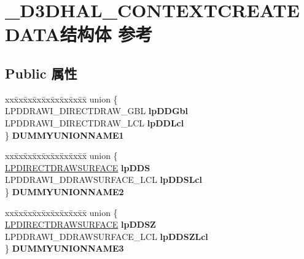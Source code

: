 \hypertarget{struct___d3_d_h_a_l___c_o_n_t_e_x_t_c_r_e_a_t_e_d_a_t_a}{}\section{\+\_\+\+D3\+D\+H\+A\+L\+\_\+\+C\+O\+N\+T\+E\+X\+T\+C\+R\+E\+A\+T\+E\+D\+A\+T\+A结构体 参考}
\label{struct___d3_d_h_a_l___c_o_n_t_e_x_t_c_r_e_a_t_e_d_a_t_a}
\subsection*{Public 属性}
\begin{DoxyCompactItemize}
\item 
\mbox{\label{struct___d3_d_h_a_l___c_o_n_t_e_x_t_c_r_e_a_t_e_d_a_t_a_a5c4d469d1fb875f5c4bb103315f87cfe}} 
\begin{tabbing}
xx\=xx\=xx\=xx\=xx\=xx\=xx\=xx\=xx\=\kill
union \{\\
\>LPDDRAWI\_DIRECTDRAW\_GBL {\bfseries lpDDGbl}\\
\>LPDDRAWI\_DIRECTDRAW\_LCL {\bfseries lpDDLcl}\\
\} {\bfseries DUMMYUNIONNAME1}\\

\end{tabbing}\item 
\mbox{\label{struct___d3_d_h_a_l___c_o_n_t_e_x_t_c_r_e_a_t_e_d_a_t_a_abb107513602891b44eb4f701273a9907}} 
\begin{tabbing}
xx\=xx\=xx\=xx\=xx\=xx\=xx\=xx\=xx\=\kill
union \{\\
\>\hyperlink{interfacevoid}{LPDIRECTDRAWSURFACE} {\bfseries lpDDS}\\
\>LPDDRAWI\_DDRAWSURFACE\_LCL {\bfseries lpDDSLcl}\\
\} {\bfseries DUMMYUNIONNAME2}\\

\end{tabbing}\item 
\mbox{\label{struct___d3_d_h_a_l___c_o_n_t_e_x_t_c_r_e_a_t_e_d_a_t_a_abffa3f00551f7072e614523e53b410a0}} 
\begin{tabbing}
xx\=xx\=xx\=xx\=xx\=xx\=xx\=xx\=xx\=\kill
union \{\\
\>\hyperlink{interfacevoid}{LPDIRECTDRAWSURFACE} {\bfseries lpDDSZ}\\
\>LPDDRAWI\_DDRAWSURFACE\_LCL {\bfseries lpDDSZLcl}\\
\} {\bfseries DUMMYUNIONNAME3}\\


\end{tabbing}
\end{DoxyCompactItemize}
